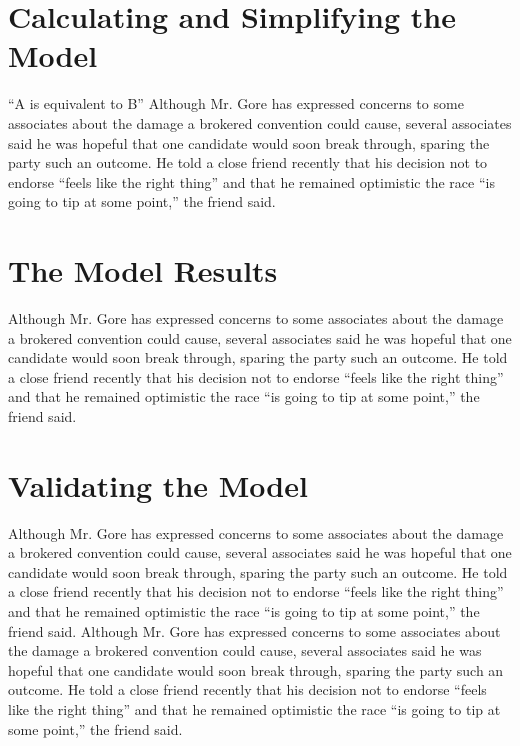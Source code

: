 \section{Calculating and Simplifying the Model  } ``A is equivalent
to B'' Although Mr. Gore has expressed concerns to some associates
about the damage a brokered convention could cause, several
associates said he was hopeful that one candidate would soon break
through, sparing the party such an outcome. He told a close friend
recently that his decision not to endorse ``feels like the right
thing'' and that he remained optimistic the race ``is going to tip
at some point,'' the friend said.



\section{The Model Results}
Although Mr. Gore has expressed concerns to some associates about
the damage a brokered convention could cause, several associates
said he was hopeful that one candidate would soon break through,
sparing the party such an outcome. He told a close friend recently
that his decision not to endorse ``feels like the right thing''
and that he remained optimistic the race ``is going to tip at some
point,'' the friend said.



\section{Validating the Model}%
Although Mr. Gore has expressed concerns to some associates about
the damage a brokered convention could cause, several associates
said he was hopeful that one candidate would soon break through,
sparing the party such an outcome. He told a close friend recently
that his decision not to endorse ``feels like the right thing''
and that he remained optimistic the race ``is going to tip at some
point,'' the friend said. Although Mr. Gore has expressed concerns
to some associates about the damage a brokered convention could
cause, several associates said he was hopeful that one candidate
would soon break through, sparing the party such an outcome. He
told a close friend recently that his decision not to endorse
``feels like the right thing'' and that he remained optimistic the
race ``is going to tip at some point,'' the friend said.


